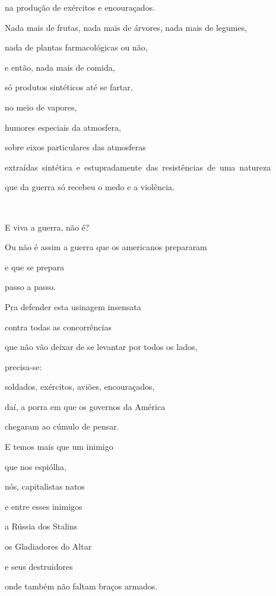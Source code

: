 na produção de exércitos e encouraçados.

Nada mais de frutas, nada mais de árvores, nada mais de legumes,

nada de plantas farmacológicas ou não,

e então, nada mais de comida,

só produtos sintéticos até se fartar, 

no meio de vapores,

humores especiais da atmosfera, 

sobre eixos particulares das atmosferas

\mbox{extraídas sintética e estupradamente das resistências de uma natureza}

que da guerra só recebeu o medo e a violência.

~

E viva a guerra, não é?

Ou não é assim a guerra que os americanos prepararam

e que se prepara

passo a passo.

Pra defender esta usinagem insensata

contra todas as concorrências

que não vão deixar de se levantar por todos os lados,

precisa-se:

soldados, exércitos, aviões, encouraçados, 

daí, a porra em que os governos da América

chegaram ao cúmulo de pensar.

\vfill


\vfill

\pagebreak

E temos mais que um inimigo

que nos espiólha,

nós, capitalistas natos

e entre esses inimigos

a Rússia dos Stalins

os Gladiadores do Altar

e seus destruidores

onde também não faltam braços armados.


